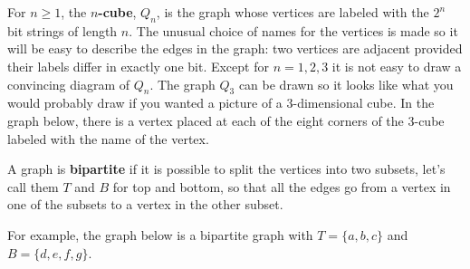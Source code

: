   For $n\geq 1$, the {\bfseries {$n$-cube}}, $Q_n$, is the graph whose vertices are labeled with the $2^{n}$ bit  strings
 of length $n$. The unusual choice of names for the vertices is made so it will be easy to describe the edges in the graph: two vertices are adjacent provided their labels differ in exactly one bit. Except for $n = 1,2,3$ it is not easy to draw a convincing diagram of $Q_{n}$. The graph $Q_{3}$ can be drawn so it looks like what you would probably draw if you wanted a picture of a 3-dimensional cube. In the graph below, there is a vertex placed at each of the eight corners of the $3${-}cube labeled with the name of the vertex.
 
 \begin{center}

\end{center}
 
  A graph is {\bfseries {bipartite}} if it is possible to split the vertices into two subsets, let's call them $T$ and $B$ for top and bottom, so that all the edges  go from a vertex in one of the subsets to a vertex in the other subset.
  
  For example, the graph below is a bipartite graph  with  $T = \{a,b,c\}$ and $B = \{d,e,f,g\}$. 
  
